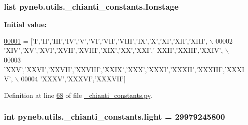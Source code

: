 \subsubsection[{Ionstage}]{\setlength{\rightskip}{0pt plus 5cm}list pyneb.\+utils.\+\_\+chianti\+\_\+constants.\+Ionstage}\label{namespacepyneb_1_1utils_1_1__chianti__constants_a21256617e8a01b45a8d911c01fd8f6fa}
{\bfseries Initial value\+:}
\begin{DoxyCode}
\hypertarget{namespacepyneb_1_1utils_1_1__chianti__constants_l00001}{}\hyperlink{namespacepyneb_1_1utils_1_1__chianti__constants}{00001} = [\textcolor{stringliteral}{'I'},\textcolor{stringliteral}{'II'},\textcolor{stringliteral}{'III'},\textcolor{stringliteral}{'IV'},\textcolor{stringliteral}{'V'},\textcolor{stringliteral}{'VI'},\textcolor{stringliteral}{'VII'},\textcolor{stringliteral}{'VIII'},\textcolor{stringliteral}{'IX'},\textcolor{stringliteral}{'X'},\textcolor{stringliteral}{'XI'},\textcolor{stringliteral}{'XII'},\textcolor{stringliteral}{'XIII'}, \(\backslash\)
00002     \textcolor{stringliteral}{'XIV'},\textcolor{stringliteral}{'XV'},\textcolor{stringliteral}{'XVI'},\textcolor{stringliteral}{'XVII'},\textcolor{stringliteral}{'XVIII'},\textcolor{stringliteral}{'XIX'},\textcolor{stringliteral}{'XX'},\textcolor{stringliteral}{'XXI'},\textcolor{stringliteral}{' XXII'},\textcolor{stringliteral}{'XXIII'},\textcolor{stringliteral}{'XXIV'}, \(\backslash\)
00003     \textcolor{stringliteral}{'XXV'},\textcolor{stringliteral}{'XXVI'},\textcolor{stringliteral}{'XXVII'},\textcolor{stringliteral}{'XXVIII'},\textcolor{stringliteral}{'XXIX'},\textcolor{stringliteral}{'XXX'},\textcolor{stringliteral}{'XXXI'},\textcolor{stringliteral}{'XXXII'},\textcolor{stringliteral}{'XXXIII'},\textcolor{stringliteral}{'XXXIV'}, \(\backslash\)
00004     \textcolor{stringliteral}{'XXXV'},\textcolor{stringliteral}{'XXXVI'},\textcolor{stringliteral}{'XXXVII'}]
\end{DoxyCode}


Definition at line \hyperlink{__chianti__constants_8py_source_l00068}{68} of file \hyperlink{__chianti__constants_8py_source}{\+\_\+chianti\+\_\+constants.\+py}.

\hypertarget{namespacepyneb_1_1utils_1_1__chianti__constants_a5c6837147cfe0f07141bf1566944dd9e}{}
\subsubsection[{light}]{\setlength{\rightskip}{0pt plus 5cm}int pyneb.\+utils.\+\_\+chianti\+\_\+constants.\+light = 29979245800}\label{namespacepyneb_1_1utils_1_1__chianti__constants_a5c6837147cfe0f07141bf1566944dd9e}


